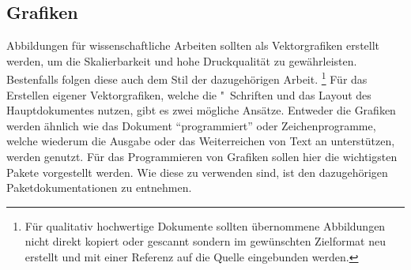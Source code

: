 \begin{DeclarePackages}
\end{DeclarePackages}
%



\subsection{%
  Grafiken%
}
%
Abbildungen für wissenschaftliche Arbeiten sollten als Vektorgrafiken erstellt 
werden, um die Skalierbarkeit und hohe Druckqualität zu gewährleisten. 
Bestenfalls folgen diese auch dem Stil der dazugehörigen Arbeit.%
\footnote{%
  Für qualitativ hochwertige Dokumente sollten übernommene Abbildungen nicht 
  direkt kopiert oder gescannt sondern im gewünschten Zielformat neu erstellt 
  und mit einer Referenz auf die Quelle eingebunden werden.%
}
Für das Erstellen eigener Vektorgrafiken, welche die "~Schriften 
und das Layout des Hauptdokumentes nutzen, gibt es zwei mögliche Ansätze. 
Entweder die Grafiken werden ähnlich wie das Dokument \enquote{programmiert} 
oder Zeichenprogramme, welche wiederum die Ausgabe oder das Weiterreichen von 
Text an  unterstützen, werden genutzt. Für das Programmieren von 
Grafiken sollen hier die wichtigsten Pakete vorgestellt werden. Wie diese zu 
verwenden sind, ist den dazugehörigen Paketdokumentationen zu entnehmen. 

